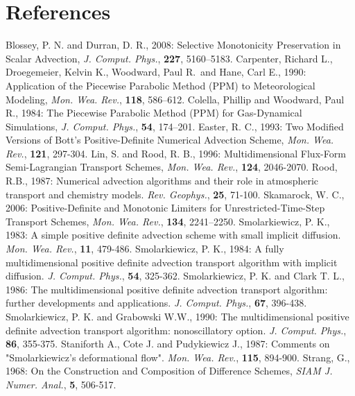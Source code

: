 \section{References}
\decrefname
Blossey, P. N. and Durran, D. R., 2008: Selective Monotonicity
   Preservation in Scalar Advection, 
   {\it J. Comput. Phys.},  {\bf 227}, 5160–5183. 
\decrefname
Carpenter, Richard L., Droegemeier, Kelvin K.,
   Woodward, Paul R.\ and Hane, Carl E., 1990: Application of the
   Piecewise Parabolic Method (PPM) to Meteorological Modeling,
  {\it Mon. Wea. Rev.},  {\bf 118}, 586--612.
\decrefname
Colella, Phillip and Woodward, Paul R., 1984: The
   Piecewise Parabolic Method (PPM) for Gas-Dynamical Simulations,
   {\it J. Comput. Phys.},  {\bf 54}, 174--201.
\decrefname
 Easter, R. C., 1993: Two Modified Versions of Bott's Positive-Definite
   Numerical Advection Scheme, {\it Mon. Wea. Rev.},  {\bf 121}, 297-304.
\decrefname
Lin, S. and Rood, R. B., 1996: Multidimensional Flux-Form
   Semi-Lagrangian Transport Schemes, 
{\it Mon. Wea. Rev.},  {\bf 124}, 2046-2070.
\decrefname
Rood, R.B., 1987: Numerical advection algorithms and their role in
atmospheric transport and chemistry models.
{\it Rev. Geophys.},  {\bf 25}, 71-100.
\decrefname
Skamarock, W. C., 2006: Positive-Definite and Monotonic Limiters for
Unrestricted-Time-Step Transport Schemes,
{\it Mon. Wea. Rev.}, {\bf 134}, 2241--2250.
\decrefname
Smolarkiewicz, P. K., 1983: A simple positive definite advection scheme with
small implicit diffusion.
{\it Mon. Wea. Rev.},  {\bf 11}, 479-486.
\decrefname
Smolarkiewicz, P. K., 1984: 
A fully multidimensional positive definite advection
transport algorithm with implicit diffusion.
{\it J. Comput. Phys.},  {\bf 54}, 325-362.
\decrefname
Smolarkiewicz, P. K. and Clark T. L., 1986: 
The multidimensional positive definite advection
transport algorithm: further developments and applications.
{\it J. Comput. Phys.},  {\bf 67}, 396-438.
\decrefname
Smolarkiewicz, P. K. and Grabowski W.W., 1990: The multidimensional
positive definite advection transport algorithm: nonoscillatory option.
{\it J. Comput. Phys.},  {\bf 86}, 355-375.
\decrefname
Staniforth A., Cote J. and Pudykiewicz J., 1987: Comments on "Smolarkiewicz's
deformational flow". {\it Mon. Wea. Rev.},  {\bf 115}, 894-900.
\decrefname
Strang, G., 1968: On the Construction and Composition of Difference Schemes, 
{\it SIAM J. Numer. Anal.}, {\bf 5}, 506-517.
%
